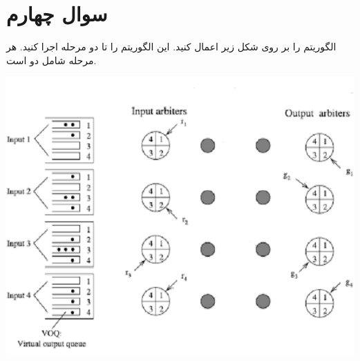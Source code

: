 \section{سوال چهارم}


الگوریتم  را بر روی شکل زیر اعمال کنید. این الگوریتم را تا دو مرحله اجرا کنید. هر مرحله شامل دو  است.


\begin{center}
	\includegraphics*[width=1\linewidth]{pics/img2.png}
	\label{شکل مورد نظر}
\end{center}